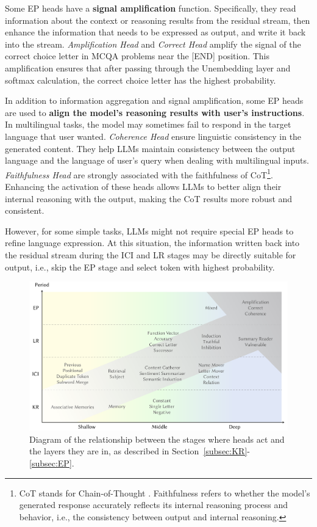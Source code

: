 \documentclass{article}
\begin{document}
Some EP heads have a \textbf{signal amplification} function. Specifically, they read information about the context or reasoning results from the residual stream, then enhance the information that needs to be expressed as output, and write it back into the stream.
\textit{Amplification Head} \citep{CorrectLetterHead_23_arXiv_DeepMind} and \textit{Correct Head} \citep{CorrectHead_24_arXiv_Allen} amplify the signal of the correct choice letter in MCQA problems near the [END] position. This amplification ensures that after passing through the Unembedding layer and softmax calculation, the correct choice letter has the highest probability.

In addition to information aggregation and signal amplification, some EP heads are used to \textbf{align the model's reasoning results with user's instructions}.
In multilingual tasks, the model may sometimes fail to respond in the target language that user wanted. \textit{Coherence Head} \citep{CrossLingual_24_SIGIR_UCAS} ensure linguistic consistency in the generated content. They help LLMs maintain consistency between the output language and the language of user's query when dealing with multilingual inputs.
\textit{Faithfulness Head} \citep{FaithfulCoT_24_ICML_Harvard} are strongly associated with the faithfulness of CoT\footnote{CoT stands for Chain-of-Thought \citep{CoT_22_NIPS_Google}. Faithfulness refers to whether the model's generated response accurately reflects its internal reasoning process and behavior, i.e., the consistency between output and internal reasoning.}. Enhancing the activation of these heads allows LLMs to better align their internal reasoning with the output, making the CoT results more robust and consistent.

However, for some simple tasks, LLMs might not require special EP heads to refine language expression. At this situation, the information written back into the residual stream during the ICI and LR stages may be directly suitable for output, i.e., skip the EP stage and select token with highest probability. 

\begin{figure}[htbp]
    \centering
    \includegraphics[width=0.75\linewidth]{figures/4periods3layers.pdf}
    \caption{Diagram of the relationship between the stages where heads act and the layers they are in, as described in Section~\ref{subsec:KR}-\ref{subsec:EP}.}
    \label{fig:4stage3layer}
\end{figure}
\end{document}
